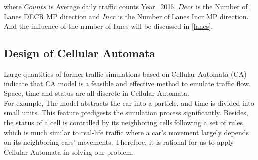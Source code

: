 \documentclass{mcmthesis}
\begin{document}
where $Counts$ is Average daily traffic counts Year\_2015, $Decr$ is the Number of Lanes DECR MP direction and $Incr$ is the Number of Lanes Incr MP direction. And the influence of the number of lanes will be discussed in \ref{lanes}.\\


\subsection{Design of Cellular Automata }
Large quantities of former traffic simulations based on Cellular Automata (CA) indicate that CA model is a feasible and effective method to emulate traffic flow. Space, time and status are all discrete in Cellular Automata. \\
\indent For example, The model abstracts the car into a particle, and time is divided into small units. This feature predigests the simulation process significantly. Besides, the status of a cell is controlled by its neighboring cells following a set of rules, which is much similar to real-life traffic where a car's movement largely depends on its neighboring cars' movements. Therefore, it is rational for us to apply Cellular Automata in solving our problem.\\
\end{document}
